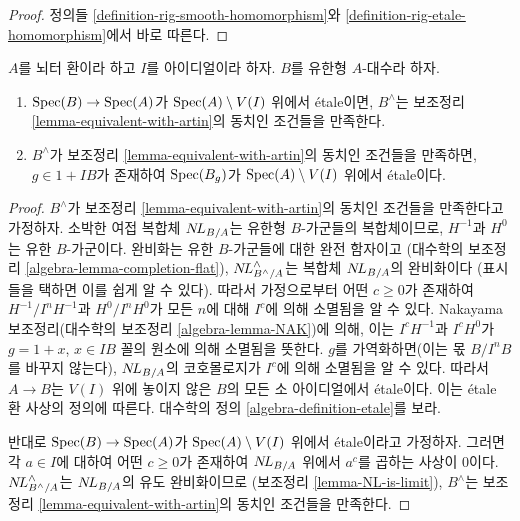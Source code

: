 \begin{proof}
정의들 \ref{definition-rig-smooth-homomorphism}와
\ref{definition-rig-etale-homomorphism}에서 바로 따른다.
\end{proof}

\begin{lemma}
\label{lemma-rig-etale}
$A$를 뇌터 환이라 하고 $I$를 아이디얼이라 하자.
$B$를 유한형 $A$-대수라 하자.
\begin{enumerate}
\item $\mathop{\mathrm{Spec}}(B) \to \mathop{\mathrm{Spec}}(A)$가 $\mathop{\mathrm{Spec}}(A) \setminus V(I)$ 위에서 \'etale이면,
$B^\wedge$는 보조정리 \ref{lemma-equivalent-with-artin}의 동치인 조건들을 만족한다.
\item $B^\wedge$가 보조정리 \ref{lemma-equivalent-with-artin}의 동치인 조건들을 만족하면,
$g \in 1 + IB$가 존재하여 $\mathop{\mathrm{Spec}}(B_g)$가
$\mathop{\mathrm{Spec}}(A) \setminus V(I)$ 위에서 \'etale이다.
\end{enumerate}
\end{lemma}

\begin{proof}
$B^\wedge$가 보조정리 \ref{lemma-equivalent-with-artin}의 동치인 조건들을 만족한다고 가정하자.
소박한 여접 복합체 $\mathop{N\!L}\nolimits_{B/A}$는 유한형 $B$-가군들의 복합체이므로,
$H^{-1}$과 $H^0$는 유한 $B$-가군이다.
완비화는 유한 $B$-가군들에 대한 완전 함자이고
(대수학의 보조정리 \ref{algebra-lemma-completion-flat}),
$\mathop{N\!L}\nolimits_{B^\wedge/A}^\wedge$는 복합체 $\mathop{N\!L}\nolimits_{B/A}$의 완비화이다
(표시들을 택하면 이를 쉽게 알 수 있다).
따라서 가정으로부터 어떤 $c \geq 0$가 존재하여
$H^{-1}/I^nH^{-1}$과 $H^0/I^nH^0$가 모든 $n$에 대해 $I^c$에 의해 소멸됨을 알 수 있다.
Nakayama 보조정리(대수학의 보조정리 \ref{algebra-lemma-NAK})에 의해,
이는 $I^cH^{-1}$과 $I^cH^0$가 $g = 1 + x$, $x \in IB$ 꼴의 원소에 의해 소멸됨을 뜻한다.
$g$를 가역화하면(이는 몫 $B/I^nB$를 바꾸지 않는다),
$\mathop{N\!L}\nolimits_{B/A}$의 코호몰로지가 $I^c$에 의해 소멸됨을 알 수 있다.
따라서 $A \to B$는 $V(I)$ 위에 놓이지 않은 $B$의 모든 소 아이디얼에서 \'etale이다.
이는 \'etale 환 사상의 정의에 따른다. 대수학의 정의 \ref{algebra-definition-etale}를 보라.

\medskip\noindent
반대로 $\mathop{\mathrm{Spec}}(B) \to \mathop{\mathrm{Spec}}(A)$가 $\mathop{\mathrm{Spec}}(A) \setminus V(I)$ 위에서 \'etale이라고 가정하자.
그러면 각 $a \in I$에 대하여 어떤 $c \geq 0$가 존재하여
$\mathop{N\!L}\nolimits_{B/A}$ 위에서 $a^c$를 곱하는 사상이 0이다.
$\mathop{N\!L}\nolimits_{B^\wedge/A}^\wedge$는 $\mathop{N\!L}\nolimits_{B/A}$의 유도 완비화이므로
(보조정리 \ref{lemma-NL-is-limit}),
$B^\wedge$는 보조정리 \ref{lemma-equivalent-with-artin}의 동치인 조건들을 만족한다.
\end{proof}

